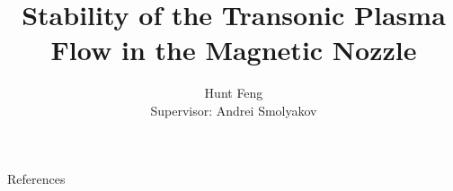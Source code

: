 \documentclass{beamer}
\title[Stability of Transonic Flow]{Stability of the Transonic Plasma Flow in the Magnetic Nozzle}
\author[HF(hunt.feng@usask.ca), SA(andrei.smolyakov@usask.ca)]
{
  Hunt Feng\\ 
  Supervisor: Andrei Smolyakov
}
\institute[]
{
  Faculty of Physics and Engineering Physics \\  
  University of Saskatchewan
}
\date{}
\begin{document}
\frame{\titlepage}




\newpage
\begin{frame}[allowframebreaks] {References}
  \tiny
  \nocite{*}
  
  
\end{frame}
\end{document}
